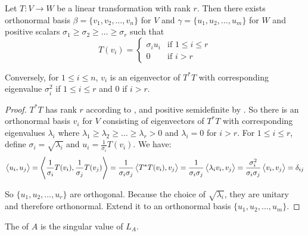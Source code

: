 \begin{theorem}
    Let $T:V \rightarrow W$ be a linear transformation with rank $r$. Then there exists orthonormal basis $\beta = \{v_1, v_2, \dots, v_n \}$ for $V$ and $\gamma = \{ u_1, u_2, \dots, u_m \}$ for $W$ and positive scalars  $\sigma_1 \geq \sigma_2 \geq \dots \geq \sigma_r$ such that
    \begin{equation}
        T(v_i) = \begin{cases}
            \sigma_i u_i & \text{if } 1 \leq i \leq r \\
            0 & \text{if } i > r
        \end{cases}
    \end{equation}
    
    Conversely, for $1 \leq i \leq n$, $v_i$ is an eigenvector of $T^*T$ with corresponding eigenvalue $\sigma_i^2$ if $1 \leq i \leq r$ and $0$ if $i > r$. 
\end{theorem}
\begin{proof}
    $T^*T$ has rank $r$ according to , and positive semidefinite by . So there is an orthonormal basis $v_i$ for $V$ consisting of eigenvectors of $T^*T$ with corresponding eigenvalues $\lambda_i$ where $\lambda_1 \geq \lambda_2 \geq \dots \geq \lambda_r > 0$ and $\lambda_i = 0$ for $i > r$. For $1 \leq i \leq r$, define $\sigma_i = \sqrt{\lambda_i}$ and $\displaystyle u_i = \frac{1}{\sigma_i} T(v_i)$. We have:
    \begin{equation*}
    \left\langle \displaystyle u_i, u_j \right\rangle = \left\langle \displaystyle \frac{1}{\sigma_i} T(v_i), \frac{1}{\sigma_j} T(v_j) \right\rangle = \frac{1}{\sigma_i \sigma_j} \left\langle \displaystyle T^*T(v_i), v_j \right\rangle = \frac{1}{\sigma_i \sigma_j} \left\langle \displaystyle \lambda_i v_i, v_j \right\rangle = \frac{\sigma_i^2}{\sigma_i \sigma_j} \left\langle \displaystyle v_i, v_j \right\rangle = \delta_{ij}
    \end{equation*}
    
    So $\{u_1, u_2, \dots, u_r \}$ are orthogonal. Because the choice of $\sqrt{\lambda_i}$, they are unitary and therefore orthonormal. Extend it to an orthonormal basis $\{u_1, u_2, \dots, u_m \}$.
\end{proof}

\begin{definition}
    The  of $A$ is the singular value of $L_A$.
\end{definition}

